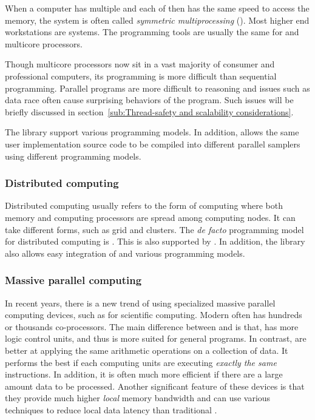When a computer has multiple \cpu and each of then has the same speed to
access the memory, the system is often called \emph{symmetric multiprocessing}
(\smp). Most higher end workstations are \smp systems. The programming tools
are usually the same for \smp and multicore processors.

Though multicore processors now sit in a vast majority of consumer and
professional computers, its programming is more difficult than sequential
programming. Parallel programs are more difficult to reasoning and issues such
as data race often cause surprising behaviors of the program. Such issues will
be briefly discussed in section~\ref{sub:Thread-safety and scalability
  considerations}.

The \vsmc library support various \smp programming models. In addition, \vsmc
allows the same user implementation source code to be compiled into different
parallel samplers using different programming models.

\subsubsection{Distributed computing}
\label{ssub:Distributed computing}

Distributed computing usually refers to the form of computing where both
memory and computing processors are spread among computing nodes. It can take
different forms, such as grid and clusters. The \emph{de facto} programming
model for distributed computing is \mpi. This is also supported by \vsmc. In
addition, the library also allows easy integration of \mpi and various \smp
programming models.

\subsubsection{Massive parallel computing}
\label{ssub:Massive parallel computing}

In recent years, there is a new trend of using specialized massive parallel
computing devices, such as \gpu for scientific computing. Modern \gpu often
has hundreds or thousands co-processors. The main difference between \gpu and
\cpu is that, \cpu has more logic control units, and thus is more suited for
general programs. In contrast, \gpu are better at applying the same arithmetic
operations on a collection of data. It performs the best if each computing
units are executing \emph{exactly the same} instructions. In addition, it is
often much more efficient if there are a large amount data to be processed.
Another significant feature of these devices is that they provide much higher
\emph{local} memory bandwidth and can use various techniques to reduce local
data latency than traditional \cpu.

